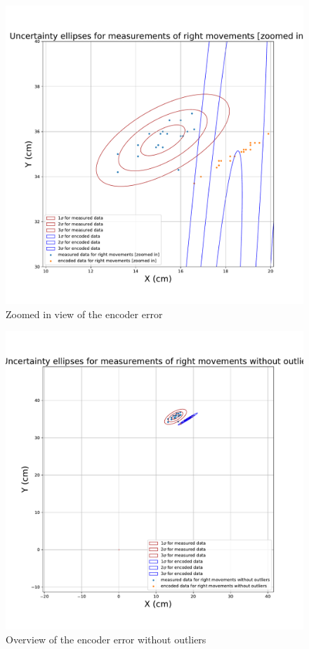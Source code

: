     \begin{figure}[!ht] 
            \centering 
            \includegraphics[page={1}, scale=.30]{images/pdf/ellipses_right_measured_vs_all_encoded_zoomed_in.pdf}
            \caption{Zoomed in view of the encoder error}
            \label{fig:encoder-5}
    \end{figure}
    
        
      \begin{figure}[!ht] 
            \centering 
            \includegraphics[page={1}, scale=.30]{images/pdf/ellipses_right_measured_vs_good_encoded.pdf}
            \caption{Overview of the encoder error without outliers}
            \label{fig:encoder-6}
    \end{figure}

